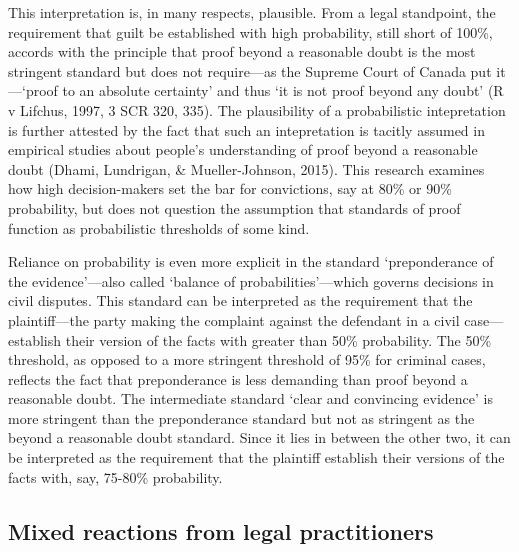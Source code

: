 \documentclass[10pt,dvipsnames,enabledeprecatedfontcommands]{scrartcl}
\begin{document}
This interpretation is, in many respects, plausible. From a legal
standpoint, the requirement that guilt be established with high
probability, still short of 100\%, accords with the principle that proof
beyond a reasonable doubt is the most stringent standard but does not
require---as the Supreme Court of Canada put it---`proof to an absolute
certainty' and thus `it is not proof beyond any doubt' (R v Lifchus,
1997, 3 SCR 320, 335). The plausibility of a probabilistic intepretation
is further attested by the fact that such an intepretation is tacitly
assumed in empirical studies about people's understanding of proof
beyond a reasonable doubt (Dhami, Lundrigan, \& Mueller-Johnson, 2015).
This research examines how high decision-makers set the bar for
convictions, say at 80\% or 90\% probability, but does not question the
assumption that standards of proof function as probabilistic thresholds
of some kind.

Reliance on probability is even more explicit in the standard
`preponderance of the evidence'---also called `balance of
probabilities'---which governs decisions in civil disputes. This
standard can be interpreted as the requirement that the plaintiff---the
party making the complaint against the defendant in a civil
case---establish their version of the facts with greater than 50\%
probability. The 50\% threshold, as opposed to a more stringent
threshold of 95\% for criminal cases, reflects the fact that
preponderance is less demanding than proof beyond a reasonable doubt.
The intermediate standard `clear and convincing evidence' is more
stringent than the preponderance standard but not as stringent as the
beyond a reasonable doubt standard. Since it lies in between the other
two, it can be interpreted as the requirement that the plaintiff
establish their versions of the facts with, say, 75-80\% probability.

\hypertarget{mixed-reactions-from-legal-practitioners}{%
\subsection{Mixed reactions from legal
practitioners}\label{mixed-reactions-from-legal-practitioners}}
\end{document}
